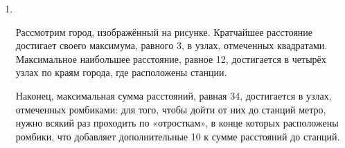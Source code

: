 \begin{enumerate}
\item \ \\

\begin{center}  \end{center}

Рассмотрим город, изображённый на рисунке. Кратчайшее расстояние достигает своего максимума, равного 3, в узлах, отмеченных квадратами. Максимальное наибольшее расстояние, равное 12, достигается в четырёх узлах по краям города, где расположены станции.

Наконец, максимальная сумма расстояний, равная 34, достигается в узлах, отмеченных ромбиками: для того, чтобы дойти от них до станций метро, нужно всякий раз проходить по «отросткам», в конце которых расположены ромбики, что добавляет дополнительные 10 к сумме расстояний до станций.

\end{enumerate}